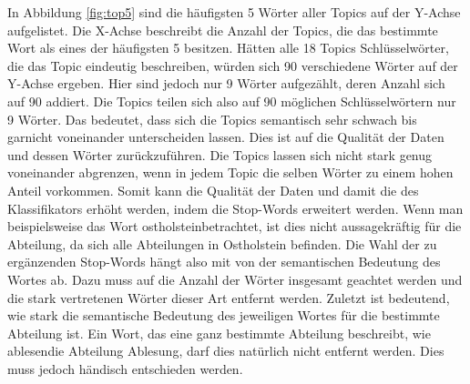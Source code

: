 \documentclass[german,version-2020-11]{uzl-thesis}
\begin{document}
In Abbildung \ref{fig:top5} sind die häufigsten 5 Wörter aller Topics auf der Y-Achse aufgelistet. Die X-Achse beschreibt die Anzahl der Topics, die das bestimmte Wort als eines der häufigsten 5 besitzen. Hätten alle 18 Topics Schlüsselwörter, die das Topic eindeutig beschreiben, würden sich 90 verschiedene Wörter auf der Y-Achse ergeben. Hier sind jedoch nur 9 Wörter aufgezählt, deren Anzahl sich auf 90 addiert. Die Topics teilen sich also auf 90 möglichen Schlüsselwörtern nur 9 Wörter. Das bedeutet, dass sich die Topics semantisch sehr schwach bis garnicht voneinander unterscheiden lassen. Dies ist auf die Qualität der Daten und dessen Wörter zurückzuführen. Die Topics lassen sich nicht stark genug voneinander abgrenzen, wenn in jedem Topic die selben Wörter zu einem hohen Anteil vorkommen. Somit kann die Qualität der Daten und damit die des Klassifikators erhöht werden, indem die Stop-Words erweitert werden. Wenn man beispielsweise das Wort \glqq ostholstein\grqq betrachtet, ist dies nicht aussagekräftig für die Abteilung, da sich alle Abteilungen in Ostholstein befinden. Die Wahl der zu ergänzenden Stop-Words hängt also mit von der semantischen Bedeutung des Wortes ab. Dazu muss auf die Anzahl der Wörter insgesamt geachtet werden und die stark vertretenen Wörter dieser Art entfernt werden. Zuletzt ist bedeutend, wie stark die semantische Bedeutung des jeweiligen Wortes für die bestimmte Abteilung ist. Ein Wort, das eine ganz bestimmte Abteilung beschreibt, wie \glqq ablesen\grqq die Abteilung \grqq Ablesung\grqq, darf dies natürlich nicht entfernt werden. Dies muss jedoch händisch entschieden werden.
\\

\end{document}
